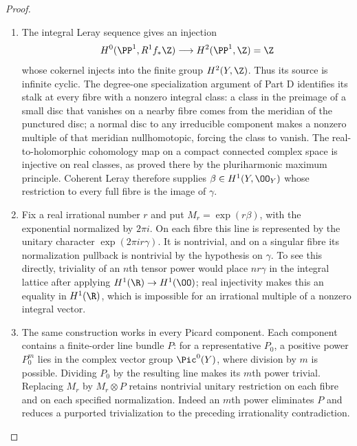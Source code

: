 \begin{proof}

\begin{enumerate}[label={$\langle1\rangle$\arabic*.},leftmargin=*]
\item The integral Leray sequence gives an injection
\[
H^0(\PP^1,R^1f_*\Z)\longrightarrow H^2(\PP^1,\Z)=\Z
\]
whose cokernel injects into the finite group $H^2(Y,\Z)$. Thus its source is infinite cyclic. The degree-one specialization argument of Part D identifies its stalk at every fibre with a nonzero integral class: a class in the preimage of a small disc that vanishes on a nearby fibre comes from the meridian of the punctured disc; a normal disc to any irreducible component makes a nonzero multiple of that meridian nullhomotopic, forcing the class to vanish. The real-to-holomorphic cohomology map on a compact connected complex space is injective on real classes, as proved there by the pluriharmonic maximum principle. Coherent Leray therefore supplies $\beta\in H^1(Y,\OO_Y)$ whose restriction to every full fibre is the image of $\gamma$.

\item Fix a real irrational number $r$ and put $M_r=\exp(r\beta)$, with the exponential normalized by $2\pi i$. On each fibre this line is represented by the unitary character $\exp(2\pi ir\gamma)$. It is nontrivial, and on a singular fibre its normalization pullback is nontrivial by the hypothesis on $\gamma$. To see this directly, triviality of an $n$th tensor power would place $nr\gamma$ in the integral lattice after applying $H^1(\R)\to H^1(\OO)$; real injectivity makes this an equality in $H^1(\R)$, which is impossible for an irrational multiple of a nonzero integral vector.

\item The same construction works in every Picard component. Each component contains a finite-order line bundle $P$: for a representative $P_0$, a positive power $P_0^m$ lies in the complex vector group $\Pic^0(Y)$, where division by $m$ is possible. Dividing $P_0$ by the resulting line makes its $m$th power trivial. Replacing $M_r$ by $M_r\otimes P$ retains nontrivial unitary restriction on each fibre and on each specified normalization. Indeed an $m$th power eliminates $P$ and reduces a purported trivialization to the preceding irrationality contradiction.


\end{enumerate}
\end{proof}
